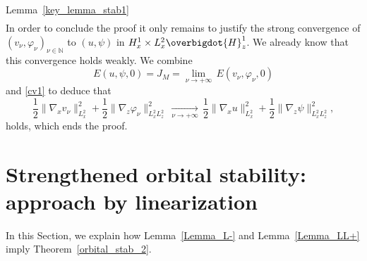 \begin{ProofOf}{Lemma~\ref{key_lemma_stab1}}
\begin{multline*}
\end{multline*}
\egroup
In order to conclude the proof it only remains to justify the strong convergence of $(v_{\nu},\varphi_{\nu})_{\nu\in\mathbb N}$ to $(u,\psi)$ in $H_{x}^{1}\times L_{x}^{2}\overbigdot{H}_{z}^{1}$. We already know that this convergence holds weakly. We combine
\[
E(u,\psi,0)=J_{M}=\underset{\nu\to+\infty}{\lim}\,E(v_{\nu},\varphi_{\nu},0)
\]
and \eqref{cv1} to deduce that
\[
\frac{1}{2}\|\nabla_{x}v_{\nu}\|_{L_{x}^{2}}^{2}+\frac{1}{2}\|\nabla_{z}\varphi_{\nu}\|_{L_{x}^{2}L_{z}^{2}}^{2}\,\underset{\nu\to+\infty}{\to}\,\frac{1}{2}\|\nabla_{x}u\|_{L_{x}^{2}}^{2}+\frac{1}{2}\|\nabla_{z}\psi\|_{L_{x}^{2}L_{z}^{2}}^{2},
\]
holds, which ends the proof.
\end{ProofOf}

\section{Strengthened orbital stability: approach by linearization}\label{OrbitalStability2}

In this Section, we explain how Lemma~\ref{Lemma_L-} and Lemma~\ref{Lemma_LL+} imply Theorem~\ref{orbital_stab_2}.

